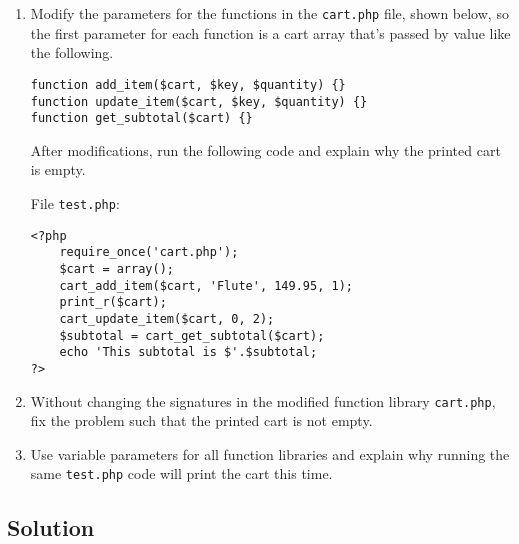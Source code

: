 \begin{enumerate}
\item Modify the parameters for the functions in the \texttt{cart.php} file, shown below, so the first parameter for each function is a cart array that's passed by value like the following.
\lstset{language=php}
\begin{lstlisting}
function add_item($cart, $key, $quantity) {}
function update_item($cart, $key, $quantity) {}
function get_subtotal($cart) {}
\end{lstlisting}

After modifications, run the following code and explain why the printed cart is empty.

File \texttt{test.php}:
\lstset{language=php, tabsize=2}
\begin{lstlisting}
<?php
	require_once('cart.php');
	$cart = array();
	cart_add_item($cart, 'Flute', 149.95, 1);
	print_r($cart);
	cart_update_item($cart, 0, 2);
	$subtotal = cart_get_subtotal($cart);
	echo 'This subtotal is $'.$subtotal;
?>
\end{lstlisting}

\item Without changing the signatures in the modified function library \texttt{cart.php}, fix the problem such that the printed cart is not empty.

\item Use variable parameters for all function libraries and explain why running the same \texttt{test.php} code will print the cart this time.
\end{enumerate}

\subsection*{Solution}

